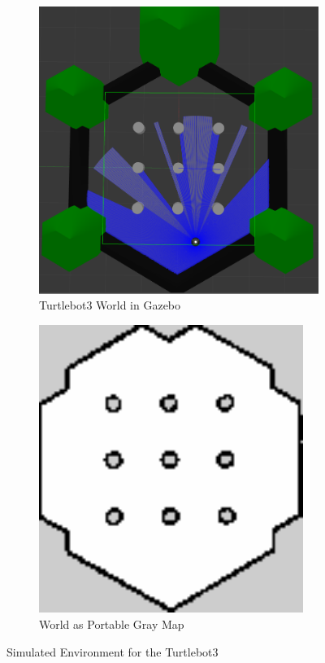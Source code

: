 \documentclass[%
paper=A4,               %
twoside=true,           %
openright,              %
11pt,                   %
bibliography=totoc,     %
titlepage=on,           %
DIV=12,                 %
BCOR=1.5cm,             %
parskip=half,            %
final
]{scrreprt}
\begin{document}
	\begin{figure}[H]
		\centering
		\begin{subfigure}[b]{0.45\textwidth}
			\centering
			\includegraphics[width=\textwidth]{Graphics/turtlebot3world.png}
			\caption{Turtlebot3 World in Gazebo}
			\label{fig:fig22}
		\end{subfigure}
		\hfill
		\begin{subfigure}[b]{0.45\textwidth}
			\centering
			\includegraphics[width=0.945\textwidth]{Graphics/mapPlain.png}
			\caption{World as Portable Gray Map}
			\label{fig:fig21}
		\end{subfigure}
		\caption{Simulated Environment for the Turtlebot3}
		\label{fig:turtlebot3world}
	\end{figure}
	
\end{document}
